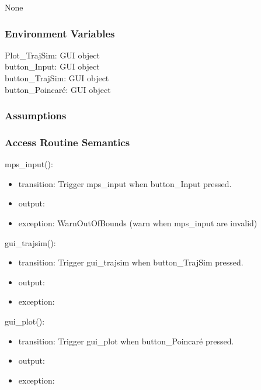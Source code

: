 \documentclass[12pt, titlepage]{article}
\begin{document}
None

\subsubsection{Environment Variables}

\noindent Plot{\_}TrajSim: GUI object\\
button{\_}Input: GUI object\\
button{\_}TrajSim: GUI object\\
button{\_}Poincar\'{e}: GUI object\\


\subsubsection{Assumptions}


\subsubsection{Access Routine Semantics}

\noindent mps\_input():
\begin{itemize}
\item transition: Trigger mps\_input when button\_Input pressed.
\item output:  
\item exception: WarnOutOfBounds (warn when mps\_input are invalid)  
\end{itemize}

\noindent gui\_trajsim():
\begin{itemize}
\item transition: Trigger gui\_trajsim when button\_TrajSim pressed.
\item output:  
\item exception:  
\end{itemize}

\noindent gui\_plot():
\begin{itemize}
\item transition: Trigger gui\_plot when button\_Poincar\'{e} pressed.
\item output:  
\item exception:  
\end{itemize}
\end{document}
